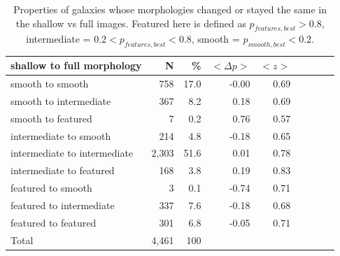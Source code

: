 \documentclass[twocolumn]{aastex6}
\begin{document}
\begin{table}
\caption{Properties of galaxies whose morphologies changed or stayed the same in the shallow vs full images. Featured here is defined as $p_{features,best}>0.8$, intermediate = $0.2<p_{features,best}<0.8$, smooth = $p_{smooth,best}<0.2$. \label{tbl:shallow_to_full_stats}}
\begin{tabular}{lrrrrrrrr}
\hline\hline
shallow to full morphology    & N       & \%       & $<\Delta p>$ & $<z>$ \\
\hline
smooth to smooth              & 758     & 17.0     & -0.00        &  0.69\\
smooth to intermediate        & 367     & 8.2      & 0.18         &  0.69\\
smooth to featured            & 7       & 0.2      & 0.76         &  0.57\\ 
intermediate to smooth        & 214     & 4.8      & -0.18        &  0.65\\
intermediate to intermediate  & 2,303   & 51.6     & 0.01         &  0.78 \\
intermediate to featured      & 168     & 3.8      & 0.19         &  0.83\\
featured to smooth            & 3       & 0.1      & -0.74        &  0.71\\
featured to intermediate      & 337     & 7.6      & -0.18        &  0.68\\
featured to featured          & 301     & 6.8      & -0.05        &  0.71\\

Total                         & 4,461   & 100      &              & \\
\hline\hline
\end{tabular}
\end{table}
\end{document}
